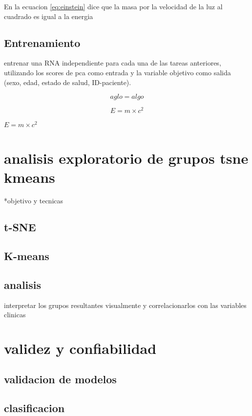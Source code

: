 \documentclass[12pt,letterpaper,oneside,openright]{book}
\begin{document}
En la ecuacion \ref{eq:einstein} dice que la masa por la velocidad de la luz al cuadrado es igual a la energia

\subsection{Entrenamiento} entrenar una RNA independiente para cada una de las tareas anteriores, utilizando los scores de pca como entrada y la variable objetivo como salida (sexo, edad, estado de salud, ID-paciente).

\begin{equation}
	aglo = algo
	\label{eq:algo}
\end{equation}

\begin{equation}
	E = m \times c^2
	\label{eq:einstein}
\end{equation}

$E = m \times c^2$


\section{analisis exploratorio de grupos tsne kmeans}
*objetivo y tecnicas
\subsection{t-SNE}
\subsection{K-means}
\subsection{analisis} interpretar los grupos resultantes visualmente y correlacionarlos con las variables clinicas


\section{validez y confiabilidad}
\subsection{validacion de modelos}
\subsection{clasificacion}
\end{document}
